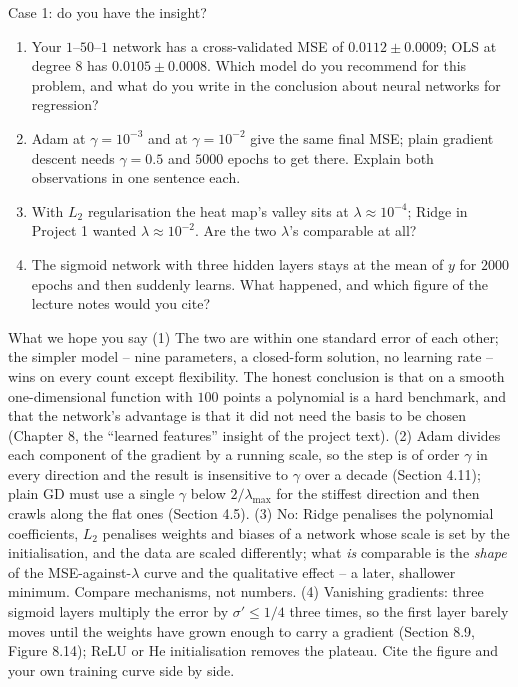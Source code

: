 \documentclass[10pt,aspectratio=169]{beamer}
\newcounter{insight}
\begin{document}
\begin{frame}{Case 1: do you have the insight?}
\scriptsize
\begin{enumerate}
  \item Your $1$--$50$--$1$ network has a cross-validated MSE of
        $0.0112\pm0.0009$; OLS at degree $8$ has $0.0105\pm0.0008$.  Which
        model do you recommend for this problem, and what do you write in the
        conclusion about neural networks for regression?
  \item Adam at $\gamma=10^{-3}$ and at $\gamma=10^{-2}$ give the same final
        MSE; plain gradient descent needs $\gamma=0.5$ and $5000$ epochs to
        get there.  Explain both observations in one sentence each.
  \item With $L_2$ regularisation the heat map's valley sits at
        $\lambda\approx10^{-4}$; Ridge in Project 1 wanted
        $\lambda\approx10^{-2}$.  Are the two $\lambda$'s comparable at all?
  \item The sigmoid network with three hidden layers stays at the mean of
        $y$ for $2000$ epochs and then suddenly learns.  What happened, and
        which figure of the lecture notes would you cite?
\end{enumerate}
\pause
\begin{block}{What we hope you say}
\scriptsize
(1) The two are within one standard error of each other; the simpler model
-- nine parameters, a closed-form solution, no learning rate -- wins on
every count except flexibility.  The honest conclusion is that on a smooth
one-dimensional function with $100$ points a polynomial is a hard
benchmark, and that the network's advantage is that it did not need the
basis to be chosen (Chapter 8, the ``learned features'' insight of the
project text).  (2) Adam divides each component of the gradient by a running
scale, so the step is of order $\gamma$ in every direction and the result is
insensitive to $\gamma$ over a decade (Section 4.11); plain GD must use a
single $\gamma$ below $2/\lambda_{\max}$ for the stiffest direction and then
crawls along the flat ones (Section 4.5).  (3) No: Ridge penalises the
polynomial coefficients, $L_2$ penalises weights and biases of a network
whose scale is set by the initialisation, and the data are scaled
differently; what \emph{is} comparable is the \emph{shape} of the
MSE-against-$\lambda$ curve and the qualitative effect -- a later, shallower
minimum.  Compare mechanisms, not numbers.  (4) Vanishing gradients: three
sigmoid layers multiply the error by $\sigma'\le1/4$ three times, so the
first layer barely moves until the weights have grown enough to carry a
gradient (Section 8.9, Figure 8.14); ReLU or He initialisation removes the
plateau.  Cite the figure and your own training curve side by side.
\end{block}
\end{frame}
\end{document}
